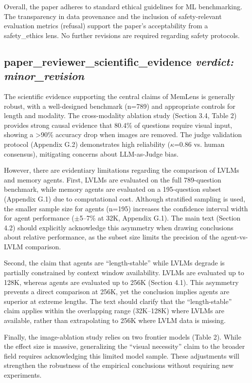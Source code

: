 \documentclass{llmxive}
\begin{document}
Overall, the paper adheres to standard ethical guidelines for ML benchmarking. The transparency in data provenance and the inclusion of safety-relevant evaluation metrics (refusal) support the paper's acceptability from a safety\_ethics lens. No further revisions are required regarding safety protocols.

\bigskip

\subsection*{paper\_reviewer\_scientific\_evidence \hfill \textit{verdict: minor\_revision}}
The scientific evidence supporting the central claims of MemLens is generally robust, with a well-designed benchmark (n=789) and appropriate controls for length and modality. The cross-modality ablation study (Section 3.4, Table 2) provides strong causal evidence that 80.4\% of questions require visual input, showing a >90\% accuracy drop when images are removed. The judge validation protocol (Appendix G.2) demonstrates high reliability ($\kappa$=0.86 vs. human consensus), mitigating concerns about LLM-as-Judge bias.

However, there are evidentiary limitations regarding the comparison of LVLMs and memory agents. First, LVLMs are evaluated on the full 789-question benchmark, while memory agents are evaluated on a 195-question subset (Appendix G.1) due to computational cost. Although stratified sampling is used, the smaller sample size for agents (n=195) increases the confidence interval width for agent performance ($\pm$5–7\% at 32K, Appendix G.1). The main text (Section 4.2) should explicitly acknowledge this asymmetry when drawing conclusions about relative performance, as the subset size limits the precision of the agent-vs-LVLM comparison.

Second, the claim that agents are ``length-stable'' while LVLMs degrade is partially constrained by context window availability. LVLMs are evaluated up to 128K, whereas agents are evaluated up to 256K (Section 4.1). This asymmetry prevents a direct comparison at 256K, yet the conclusion implies agents are superior at extreme lengths. The text should clarify that the ``length-stable'' claim applies within the overlapping range (32K–128K) where LVLMs are available, rather than extrapolating to 256K where LVLM data is missing.

Finally, the image-ablation study relies on two frontier models (Table 2). While the effect size is massive, generalizing the ``visual necessity'' claim to the broader field requires acknowledging this limited model sample. These adjustments will strengthen the robustness of the empirical conclusions without requiring new experiments.
\end{document}
